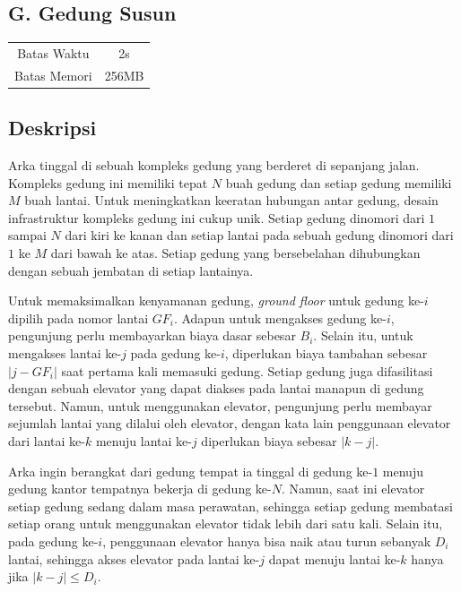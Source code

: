 \documentclass{article}
\begin{document}
\begin{center}
    \section*{G. Gedung Susun} %

    \begin{tabular}{ | c c | }
        \hline
        Batas Waktu  & 2s \\    %
        Batas Memori & 256MB \\  %
        \hline
    \end{tabular}
\end{center}

\subsection*{Deskripsi}
Arka tinggal di sebuah kompleks gedung yang berderet di sepanjang jalan. Kompleks gedung ini memiliki tepat $N$ buah gedung dan setiap gedung memiliki $M$ buah lantai. Untuk meningkatkan keeratan hubungan antar gedung, desain infrastruktur kompleks gedung ini cukup unik. Setiap gedung dinomori dari $1$ sampai $N$ dari kiri ke kanan dan setiap lantai pada sebuah gedung dinomori dari $1$ ke $M$ dari bawah ke atas. Setiap gedung yang bersebelahan dihubungkan dengan sebuah jembatan di setiap lantainya. 

Untuk memaksimalkan kenyamanan gedung, \textit{ground floor} untuk gedung ke-$i$ dipilih pada nomor lantai $GF_{i}$. Adapun untuk mengakses gedung ke-$i$, pengunjung perlu membayarkan biaya dasar sebesar $B_{i}$. Selain itu, untuk mengakses lantai ke-$j$ pada gedung ke-${i}$, diperlukan biaya tambahan sebesar $|j - GF_{i}|$ saat pertama kali memasuki gedung. Setiap gedung juga difasilitasi dengan sebuah elevator yang dapat diakses pada lantai manapun di gedung tersebut. Namun, untuk menggunakan elevator, pengunjung perlu membayar sejumlah lantai yang dilalui oleh elevator, dengan kata lain penggunaan elevator dari lantai ke-$k$ menuju lantai ke-$j$ diperlukan biaya sebesar $|k-j|$.

Arka ingin berangkat dari gedung tempat ia tinggal di gedung ke-$1$ menuju gedung kantor tempatnya bekerja di gedung ke-$N$. Namun, saat ini elevator setiap gedung sedang dalam masa perawatan, sehingga setiap gedung membatasi setiap orang untuk menggunakan elevator tidak lebih dari satu kali. Selain itu, pada gedung ke-$i$, penggunaan elevator hanya bisa naik atau turun sebanyak $D_{i}$ lantai, sehingga akses elevator pada lantai ke-$j$ dapat menuju lantai ke-$k$ hanya jika $|k-j|\leq D_{i}$.
\end{document}
